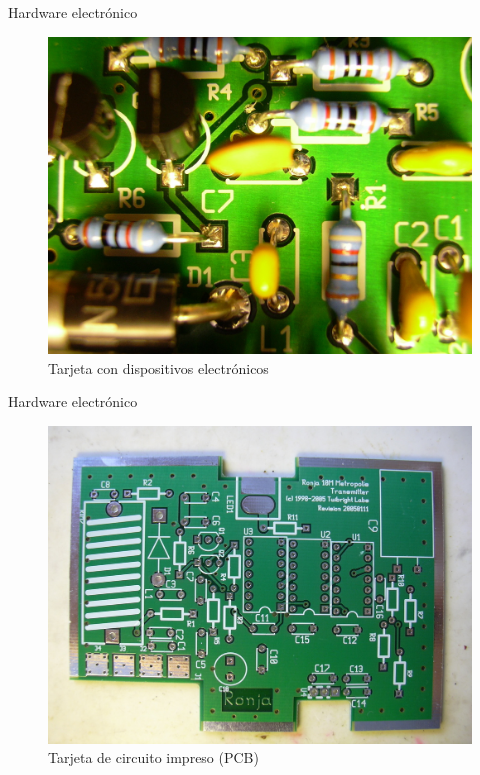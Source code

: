 \documentclass{beamer}
\begin{document}
\begin{frame}{Hardware electrónico}
  \begin{figure}
    \includegraphics[scale=0.85]{transmisor/1b84}
    \caption{Tarjeta con dispositivos electrónicos}
  \end{figure}
\end{frame}

\begin{frame}{Hardware electrónico}
  \begin{figure}
    \includegraphics[scale=0.85]{transmisor/1b5e}
    \caption{Tarjeta de circuito impreso (PCB)}
  \end{figure}
\end{frame}
\end{document}
